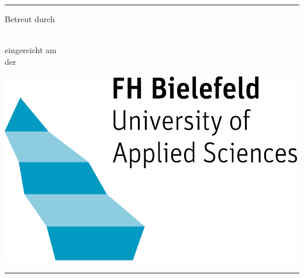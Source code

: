 \begin{titlepage}
	\hrule
	\vspace*{3cm}
	\begin{center}
		{\LARGE \textsc{\showtitle}}

		\vspace*{30pt}

		{\Large \showauthor}

		\vspace*{20pt}

		{Betreut durch \showtutor}

		\vspace*{48pt}
		\textbf{\showsubject}\\
		eingereicht am \showdepartment\\
		der \showinstitute

		\vspace*{48pt}
		\noindent{\today}

		\vspace*{64pt}
		\includegraphics[scale=0.5]{assets/fh-logo.pdf}
	\end{center}
	\vfill
	\hrule
\end{titlepage}
\restoregeometry
